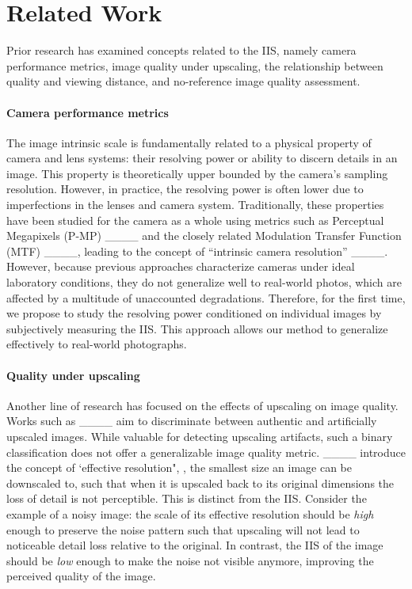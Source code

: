 \section{Related Work}
Prior research has examined concepts related to the IIS, namely camera performance metrics, image quality under upscaling, the relationship between quality and viewing distance, and no-reference image quality assessment.

\paragraph{Camera performance metrics} The image intrinsic scale is fundamentally related to a physical property of camera and lens systems: their resolving power or ability to discern details in an image. This property is theoretically upper bounded by the camera's sampling resolution. However, in practice, the resolving power is often lower due to imperfections in the lenses and camera system. Traditionally, these properties have been studied for the camera as a whole using metrics such as Perceptual Megapixels (P-MP) ____ and the closely related Modulation Transfer Function (MTF) ____, leading to the concept of ``intrinsic camera resolution'' ____. However, because previous approaches characterize cameras under ideal laboratory conditions, they do not generalize well to real-world photos, which are affected by a multitude of unaccounted degradations. Therefore, for the first time, we propose to study the resolving power conditioned on individual images by subjectively measuring the IIS. This approach allows our method to generalize effectively to real-world photographs.

\paragraph{Quality under upscaling} Another line of research has focused on the effects of upscaling on image quality.
Works such as ____ aim to discriminate between authentic and artificially upscaled images. While valuable for detecting upscaling artifacts, such a binary classification does not offer a generalizable image quality metric.
____ introduce the concept of `effective resolution", \ie, the smallest size an image can be downscaled to, such that when it is upscaled back to its original dimensions the loss of detail is not perceptible.
This is distinct from the IIS. Consider the example of a noisy image: the scale of its effective resolution should be \textit{high} enough to preserve the noise pattern such that upscaling will not lead to noticeable detail loss relative to the original. In contrast, the IIS of the image should be \textit{low} enough to make the noise not visible anymore, improving the perceived quality of the image.

